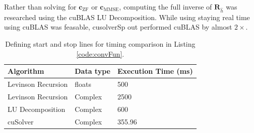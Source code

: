 Rather than solving for $\mathbf{c}_\text{ZF}$ or $\mathbf{c}_\text{MMSE}$, computing the full inverse of $\mathbf{R}_{\hat{h}}$ was researched using the cuBLAS LU Decomposition.
While using staying real time using cuBLAS was feasable, cusolverSp out performed cuBLAS by almost $2\times$.
\begin{table}
\caption{Defining start and stop lines for timing comparison in Listing \ref{code:convFun}.}
\begin{center}
\begin{tabular}{lll}
	\toprule
	Algorithm 			& Data type	& Execution Time (ms)	\\ \midrule
	Levinson Recursion 	& floats 	& 500 					\\
	Levinson Recursion 	& Complex 	& 2500 					\\
	LU Decomposition 	& Complex 	& 600				 	\\
	cuSolver			& Complex	& 355.96				\\
	\bottomrule
\end{tabular}
\end{center}
\label{tab:ZFMMSEtimingComparison}
\end{table}
%
